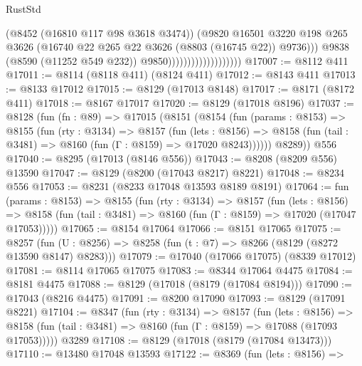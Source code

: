 \begin{lexlean}{RustStd}
\begin{coremodule}
                                            (@8452 (@16810 @117 @98 @3618 @3474))
                                            (@9820
                                              @16501
                                              @3220
                                              @198
                                              @265
                                              @3626
                                              (@16740
                                                @22
                                                @265
                                                @22
                                                @3626
                                                (@8803 (@16745 @22))
                                                @9736)))
                                          @9838
                                          (@8590 (@11252 @549 @232))
                                          @9850)))))))))))))))))))
@17007 := @8112 @411
@17011 := @8114 (@8118 @411) (@8124 @411)
@17012 := @8143 @411
@17013 := @8133 @17012
@17015 := @8129 (@17013 @8148)
@17017 := @8171 (@8172 @411)
@17018 := @8167 @17017
@17020 := @8129 (@17018 @8196)
@17037 := @8128
    (fun (fn : @89) =>
    @17015
      (@8151
        (@8154
          (fun (params : @8153) =>
          @8155
            (fun (rty : @3134) =>
            @8157
              (fun (lets : @8156) =>
              @8158 (fun (tail : @3481) => @8160 (fun (Γ : @8159) => @17020 @8243))))))
        @8289))
    @556
@17040 := @8295 (@17013 (@8146 @556))
@17043 := @8208 (@8209 @556) @13590
@17047 := @8129 (@8200 (@17043 @8217) @8221)
@17048 := @8234 @556
@17053 := @8231 (@8233 @17048 @13593 @8189 @8191)
@17064 := fun (params : @8153) =>
  @8155
    (fun (rty : @3134) =>
    @8157
      (fun (lets : @8156) =>
      @8158 (fun (tail : @3481) => @8160 (fun (Γ : @8159) => @17020 (@17047 @17053)))))
@17065 := @8154 @17064
@17066 := @8151 @17065
@17075 := @8257
    (fun (U : @8256) => @8258 (fun (t : @7) => @8266 (@8129 (@8272 @13590 @8147) @8283)))
@17079 := @17040 (@17066 @17075) (@8339 @17012)
@17081 := @8114 @17065 @17075
@17083 := @8344 @17064 @4475
@17084 := @8181 @4475
@17088 := @8129 (@17018 (@8179 (@17084 @8194)))
@17090 := @17043 (@8216 @4475)
@17091 := @8200 @17090
@17093 := @8129 (@17091 @8221)
@17104 := @8347
    (fun (rty : @3134) =>
    @8157
      (fun (lets : @8156) =>
      @8158 (fun (tail : @3481) => @8160 (fun (Γ : @8159) => @17088 (@17093 @17053)))))
    @3289
@17108 := @8129 (@17018 (@8179 (@17084 @13473)))
@17110 := @13480 @17048 @13593
@17122 := @8369
    (fun (lets : @8156) =>

\end{coremodule}
\end{lexlean}
